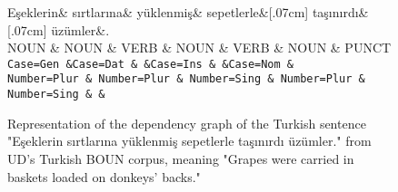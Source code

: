 \documentclass[11pt]{article}
\begin{document}
\begin{figure*}
\centering
  \begin{dependency}
    \begin{deptext}[column sep=.05cm, row sep=.01cm]
      Eşeklerin\& sırtlarına\& yüklenmiş\& sepetlerle\&[.07cm] taşınırdı\&[.07cm] üzümler\&.\\
      NOUN \& NOUN \& VERB \& NOUN \& VERB \& NOUN \& PUNCT\\
      \tt Case=Gen \&\tt Case=Dat \& \&\tt Case=Ins \& \&\tt Case=Nom \& \\
      Number=Plur \& Number=Plur \& Number=Sing \& Number=Plur \& Number=Sing \& \& \\
    \end{deptext}
  \end{dependency}
  \caption{Representation of the dependency graph of the Turkish sentence "Eşeklerin sırtlarına yüklenmiş sepetlerle taşınırdı üzümler." from UD's Turkish BOUN corpus, meaning "Grapes were carried in baskets loaded on donkeys' backs."}
  \label{fig:ud}
\end{figure*}
\end{document}
